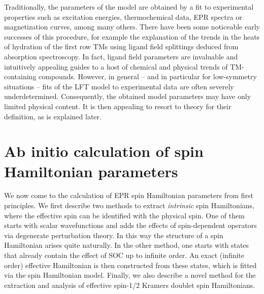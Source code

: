 Traditionally, the parameters of the model are obtained by a fit to experimental properties such as excitation energies, thermochemical data, EPR spectra or magnetization curves, among many others. There have been some noticeable early successes of this procedure, for example the explanation of the trends in the heats of hydration of the first row TMs using ligand field splittings deduced from absorption spectroscopy.\cite{Orgel_1952_4756, GriffO_1957_381, HolmeM_1957_1686} In fact, ligand field parameters are invaluable and intuitively appealing guides to a host of chemical and physical trends of TM-containing compounds. However, in general -- and in particular for low-symmetry situations -- fits of the LFT model to experimental data are often severely underdetermined. Consequently, the obtained model parameters may have only limited physical content. It is then appealing to resort to theory for their definition, as is explained later. 


\section{Ab initio calculation of spin Hamiltonian parameters}
We now come to the calculation of EPR spin Hamiltonian parameters from first principles. We first describe two methods to extract \emph{intrinsic} spin Hamiltonians, where the effective spin can be identified with the physical spin. One of them starts with scalar wavefunctions and adds the effects of spin-dependent operators via degenerate perturbation theory. In this way the structure of a spin Hamiltonian arises quite naturally. In the other method, one starts with states that already contain the effect of SOC up to infinite order. An exact (infinite order) effective Hamiltonian is then constructed from these states, which is fitted via the spin Hamiltonian model.
Finally, we also describe a novel method for the extraction and analysis of effective spin-1/2 Kramers doublet spin Hamiltonians.

